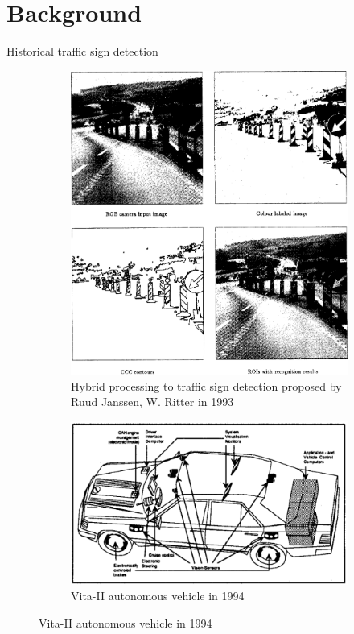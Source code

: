 \documentclass{beamer}
\begin{document}
\section{Background}
\begin{frame}{Historical traffic sign detection}
    \begin{figure}
      \begin{center}
        \begin{subfigure}[t]{.48\linewidth}
          \centering
          \includegraphics[width=.9\linewidth]{figures/1993trafficsigndetection.png}
          \caption{Hybrid processing to traffic sign detection proposed by Ruud Janssen, W. Ritter in 1993 \cite{janssen1993hybrid}}
        \end{subfigure}
        \begin{subfigure}[t]{.48\linewidth}
          \centering
          \includegraphics[width=.9\linewidth]{figures/vita2.png}
          \caption{Vita-II autonomous vehicle in 1994 \cite{ulmer1994vita}}
          \label{fig:resblock}
        \end{subfigure}
      \end{center}
    \end{figure}
\end{frame}{}
\end{document}
